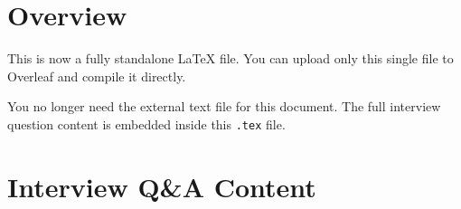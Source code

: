 \section{Overview}

This is now a fully standalone LaTeX file. You can upload only this single file to Overleaf and compile it directly.

\begin{infobox}
You no longer need the external text file for this document. The full interview question content is embedded inside this \texttt{.tex} file.
\end{infobox}

\section{Interview Q\&A Content}

{\small
{}
}


